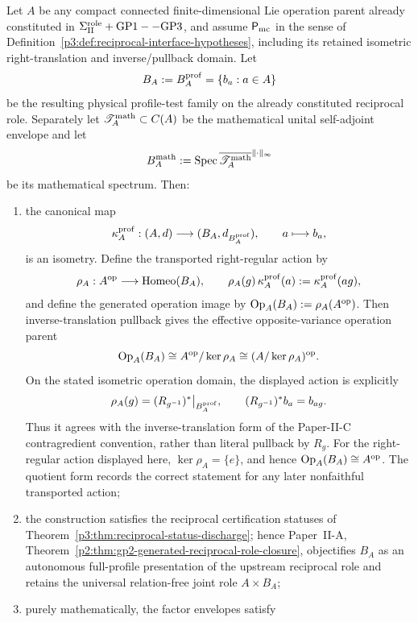 \documentclass[11pt,a4paper]{article}
\begin{document}
\begin{theorem}
\label{p3:def:intrinsic-born-reciprocal-constitution}
Let \(A\) be any compact connected finite-dimensional Lie operation parent
already constituted in
\(\Sigma_{\rm II}^{\rm role}+\mathrm{GP1--GP3}\), and assume
\(\mathsf P_{\rm mc}\) in the sense of
Definition~\ref{p3:def:reciprocal-interface-hypotheses}, including its
retained isometric right-translation and inverse/pullback domain. Let
\[
 B_A:=B_A^{\rm prof}=\{b_a:a\in A\}
\]
be the resulting physical profile-test family on the already constituted
reciprocal role.  Separately let
\(\mathscr T_A^{\rm math}\subset C(A)\) be the mathematical unital
self-adjoint envelope and let
\[
 B_A^{\rm math}:=
 \operatorname{Spec}
 \overline{\mathscr T_A^{\rm math}}^{\|\cdot\|_\infty}
\]
be its mathematical spectrum.  Then:
\begin{enumerate}[label=(\roman*),leftmargin=2.2em]
\item the canonical map
\[
 \kappa_A^{\rm prof}:(A,d)\longrightarrow
 (B_A,d_{B_A^{\rm prof}}),
 \qquad a\longmapsto b_a,
\]
is an isometry.  Define the transported right-regular action by
\[
 \rho_A:A^{\rm op}\longrightarrow\operatorname{Homeo}(B_A),
 \qquad
 \rho_A(g)\,\kappa_A^{\rm prof}(a):=\kappa_A^{\rm prof}(ag),
\]
and define the generated operation image by
\(\operatorname{Op}_A(B_A):=\rho_A(A^{\rm op})\).  Then inverse-translation pullback gives the
effective opposite-variance operation parent
\[
 \operatorname{Op}_A(B_A)
 \cong A^{\rm op}/\ker\rho_A
 \cong (A/\ker\rho_A)^{\rm op}.
\]
On the stated isometric operation domain, the displayed action is explicitly
\[
 \rho_A(g)=(R_{g^{-1}})^*\big|_{B_A^{\rm prof}},
 \qquad (R_{g^{-1}})^*b_a=b_{ag}.
\]
Thus it agrees with the inverse-translation form of the Paper-II-C
contragredient convention, rather than literal pullback by \(R_g\).
For the right-regular action displayed here, \(\ker\rho_A=\{e\}\), and hence
\(\operatorname{Op}_A(B_A)\cong A^{\rm op}\).  The quotient form records the
correct statement for any later nonfaithful transported action;
\item the construction satisfies the reciprocal certification statuses of
Theorem~\ref{p3:thm:reciprocal-status-discharge}; hence Paper~II-A,
Theorem~\ref{p2:thm:gp2-generated-reciprocal-role-closure}, objectifies
\(B_A\) as an autonomous full-profile presentation of the upstream reciprocal
role and retains the universal relation-free joint role \(A\times B_A\);
\item purely mathematically, the factor envelopes satisfy

\end{enumerate}
\end{theorem}
\end{document}
